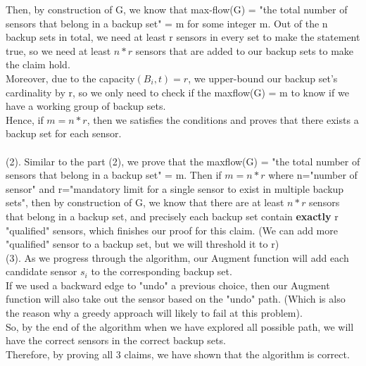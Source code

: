 \documentclass{assignment-373}
\begin{document}
\begin{enumerate}
    \phantom{=} \phantom{=} Then, by construction of G, we know that max-flow(G) = "the total number of sensors that belong in a backup set" = m for some integer m. Out of the n backup sets in total, we need at least r sensors in every set to make the statement true, so we need at least $n*r$ sensors that are added to our backup sets to make the claim hold.\\
    \phantom{=} \phantom{=} Moreover, due to the capacity$(B_i,t)=r$, we upper-bound our backup set's cardinality by r, so we only need to check if the maxflow(G) = m to know if we have a working group of backup sets.\\
    \phantom{=} \phantom{=} Hence, if $m = n*r$, then we satisfies the conditions and proves that there exists a backup set for each sensor.\\
    \\
    (2). Similar to the part (2), we prove that the maxflow(G) = "the total number of sensors that belong in a backup set" = m. Then if $m = n*r$ where n="number of sensor" and r="mandatory limit for a single sensor to exist in multiple backup sets", then by construction of G, we know that there are at least $n*r$ sensors that belong in a backup set, and precisely each backup set contain \textbf{exactly} r "qualified" sensors, which finishes our proof for this claim. (We can add more "qualified" sensor to a backup set, but we will threshold it to r)\\
    
    (3). As we progress through the algorithm, our Augment function will add each candidate sensor $s_i$ to the corresponding backup set.\\
    \phantom{=} \phantom{=} If we used a backward edge to "undo" a previous choice, then our Augment function will also take out the sensor based on the "undo" path. (Which is also the reason why a greedy approach will likely to fail at this problem).\\
    \phantom{=} \phantom{=} So, by the end of the algorithm when we have explored all possible path, we will have the correct sensors in the correct backup sets.\\
    
    Therefore, by proving all 3 claims, we have shown that the algorithm is correct.\\
    

\end{enumerate}
\end{document}
